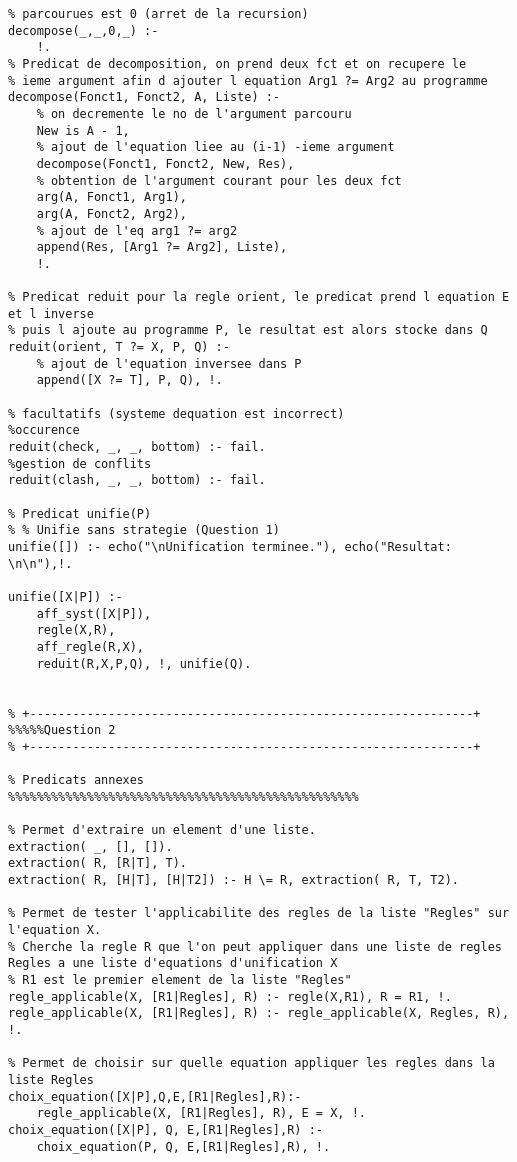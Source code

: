 \documentclass[10pt,a4paper]{report}
\begin{document}
\begin{lstlisting}[caption ={le fichier main.pl}]
% Predicat de decomposition, cas ou l'argument des 2 fct 
% parcourues est 0 (arret de la recursion)	
decompose(_,_,0,_) :-
	!.
% Predicat de decomposition, on prend deux fct et on recupere le 
% ieme argument afin d ajouter l equation Arg1 ?= Arg2 au programme
decompose(Fonct1, Fonct2, A, Liste) :-
	% on decremente le no de l'argument parcouru
	New is A - 1,		
	% ajout de l'equation liee au (i-1) -ieme argument
	decompose(Fonct1, Fonct2, New, Res),
	% obtention de l'argument courant pour les deux fct
	arg(A, Fonct1, Arg1),
	arg(A, Fonct2, Arg2),
	% ajout de l'eq arg1 ?= arg2
	append(Res, [Arg1 ?= Arg2], Liste), 
	!.

% Predicat reduit pour la regle orient, le predicat prend l equation E et l inverse
% puis l ajoute au programme P, le resultat est alors stocke dans Q
reduit(orient, T ?= X, P, Q) :-
	% ajout de l'equation inversee dans P
	append([X ?= T], P, Q), !.
	
% facultatifs (systeme dequation est incorrect)
%occurence
reduit(check, _, _, bottom) :- fail.
%gestion de conflits
reduit(clash, _, _, bottom) :- fail.

% Predicat unifie(P)
% % Unifie sans strategie (Question 1)
unifie([]) :- echo("\nUnification terminee."), echo("Resultat: \n\n"),!.

unifie([X|P]) :-
	aff_syst([X|P]),
	regle(X,R),
	aff_regle(R,X),
	reduit(R,X,P,Q), !, unifie(Q).


% +--------------------------------------------------------------+
%%%%%Question 2
% +--------------------------------------------------------------+

% Predicats annexes
%%%%%%%%%%%%%%%%%%%%%%%%%%%%%%%%%%%%%%%%%%%%%%%%%

% Permet d'extraire un element d'une liste.
extraction( _, [], []).
extraction( R, [R|T], T).
extraction( R, [H|T], [H|T2]) :- H \= R, extraction( R, T, T2).

% Permet de tester l'applicabilite des regles de la liste "Regles" sur l'equation X.
% Cherche la regle R que l'on peut appliquer dans une liste de regles Regles a une liste d'equations d'unification X
% R1 est le premier element de la liste "Regles"
regle_applicable(X, [R1|Regles], R) :- regle(X,R1), R = R1, !.
regle_applicable(X, [R1|Regles], R) :- regle_applicable(X, Regles, R), !.

% Permet de choisir sur quelle equation appliquer les regles dans la liste Regles
choix_equation([X|P],Q,E,[R1|Regles],R):-
	regle_applicable(X, [R1|Regles], R), E = X, !.
choix_equation([X|P], Q, E,[R1|Regles],R) :-
	choix_equation(P, Q, E,[R1|Regles],R), !.



\end{lstlisting}
\end{document}
